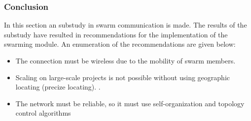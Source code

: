 \documentclass[10pt,a4paper]{article}
\begin{document}
\begin{table}[H]
\centering
\caption{A table with a summirazing of the protocols. The table is based on information from \cite{comparitivestudywirelessprotocols}.}
\label{sumtableprotocols}
\end{table}






\subsubsection{Conclusion}
In this section an substudy in swarm communication is made. The results of the substudy have resulted in recommendations for the implementation of the swarming module. An enumeration of the recommendations are given below:
\begin{itemize}
\setlength\itemsep{0em}
    \item The connection must be wireless due to the mobility of swarm members.
    \item Scaling on large-scale projects is not possible without using geographic locating (precize locating). \cite{geographicalrouting}\cite{scalablelocation}. 
    \item The network must be reliable, so it must use self-organization and topology control algorithms \cite{WMN1}
\end{itemize}
\end{document}
